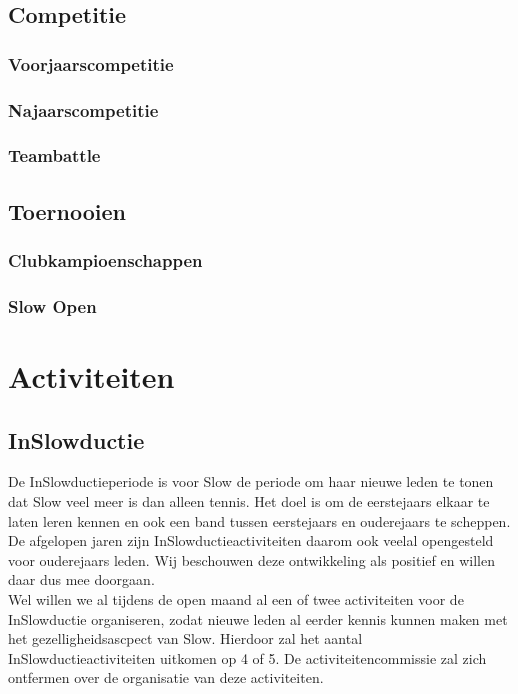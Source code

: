 \documentclass[]{article}
\begin{document}
\subsection{Competitie}
\subsubsection{Voorjaarscompetitie}

\subsubsection{Najaarscompetitie}

\subsubsection{Teambattle}

\subsection{Toernooien}
\subsubsection{Clubkampioenschappen}

\subsubsection{Slow Open}

\section{Activiteiten}
\subsection{InSlowductie}
De InSlowductieperiode is voor Slow de periode om haar nieuwe leden te tonen dat Slow veel meer is dan alleen tennis. Het doel is om de eerstejaars elkaar te laten leren kennen en ook een band tussen eerstejaars en ouderejaars te scheppen. De afgelopen jaren zijn InSlowductieactiviteiten daarom ook veelal opengesteld voor ouderejaars leden. Wij beschouwen deze ontwikkeling als positief en willen daar dus mee doorgaan.\\
Wel willen we al tijdens de open maand al een of twee activiteiten voor de InSlowductie organiseren, zodat nieuwe leden al eerder kennis kunnen maken met het gezelligheidsascpect van Slow. Hierdoor zal het aantal InSlowductieactiviteiten uitkomen op 4 of 5. De activiteitencommissie zal zich ontfermen over de organisatie van deze activiteiten.
\end{document}
